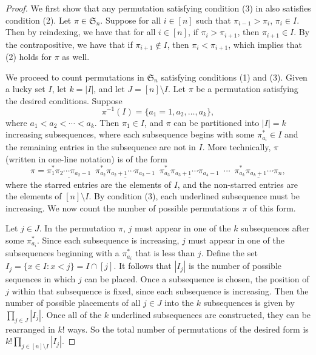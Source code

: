 \documentclass[reqno]{amsart}
\newcommand{\Sym}{\mathfrak{S}}
\def\inv{^{-1}}
\theoremstyle{definition}
\theoremstyle{remark}
\begin{document}
\begin{proof}
We first show that any permutation satisfying condition (3) in  also satisfies condition (2). Let $\pi \in \Sym_n$. Suppose for all $i \in [n] $ such that $\pi_{i-1}> \pi_i$, $\pi_i \in I$. 
Then by reindexing, we have that for all $i \in[n]$, if $\pi_{i}>\pi_{i+1}$, then $\pi_{i+1}\in I$. By the contrapositive, we have that
if $\pi_{i+1} \not\in I$, then $\pi_{i} < \pi_{i+1}$, which implies that (2) holds for $\pi$ as well.

We proceed to count permutations in $\Sym_n$ satisfying conditions (1) and (3). 
Given a lucky set $I$, let $k = |I|$, and let $J = [n] \setminus I$. 
Let $\pi$ be a permutation satisfying the desired conditions. 
Suppose \[\pi\inv(I) = \{a_1=1, a_2, \ldots, a_k\},\] 
where $a_1 < a_2 < \cdots < a_k$. 
Then $\pi_1 \in I$, and $\pi$ can be partitioned into $|I| = k$ increasing subsequences, where each subsequence begins with some $\pi_{a_i}^* \in I$ and the remaining entries in the subsequence are not in $I$. More technically, $\pi$ (written in one-line notation) is of the form
\[
\pi = \underline{\pi_1^* \pi_2 \cdots \pi_{a_2-1}}\,\, \,\underline{\pi_{a_2}^* \pi_{a_2+1} \cdots \pi_{a_3-1}} \,\, \,\underline{\pi_{a_3}^* \pi_{a_3+1} \cdots \pi_{a_4-1}}  \,\, \,\cdots \,\,\,\underline{\pi_{a_k}^* \pi_{a_k+1} \cdots \pi_{n}},
\]
where the starred entries are the elements of $I$, and the non-starred entries are the elements of $[n] \setminus I$. 
By condition (3), each underlined subsequence must be increasing. 
We now count the number of possible permutations $\pi$ of this form. 

Let $j \in J$. In the permutation $\pi$, $j$ must appear in one of the $k$ subsequences after some $\pi_{a_i}^*$. Since each subsequence is increasing, $j$ must appear in one of the subsequences beginning with a $\pi_{a_i}^*$ that is less than $j$.
Define the set $I_j = \{x\in I: x<j\} = I \cap [j]$. It follows that $|I_j|$ is the number of possible sequences in which $j$ can be placed. Once a subsequence is chosen, the position of $j$ within that subsequence is fixed, since each subsequence is increasing. Then the number of possible placements of all $j\in J$ into the $k$ subsequences is given by $\prod_{j\in J} |I_j|$.
Once all of the $k$ underlined subsequences are constructed, they can be rearranged in $k!$ ways. So the total number of permutations of the desired form is $k! \prod_{j\in [n]\setminus I} |I_j|$.


\end{proof}
\end{document}
